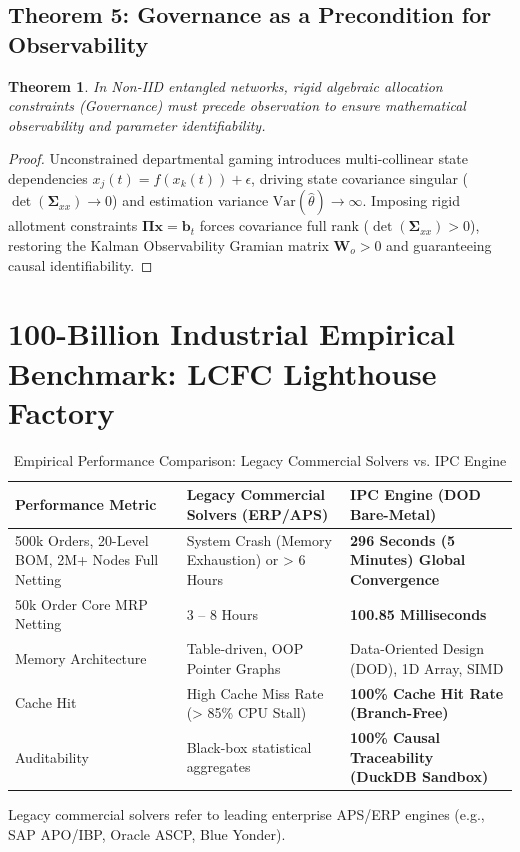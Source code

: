 \documentclass[11pt,a4paper]{article}
\newtheorem{theorem}{Theorem}[section]
\begin{document}
\subsection*{Theorem 5: Governance as a Precondition for Observability}
\begin{theorem}
In Non-IID entangled networks, rigid algebraic allocation constraints (Governance) must precede observation to ensure mathematical observability and parameter identifiability.
\end{theorem}
\begin{proof}
Unconstrained departmental gaming introduces multi-collinear state dependencies $x_j(t) = f(x_k(t)) + \epsilon$, driving state covariance singular ($\det(\mathbf{\Sigma}_{xx}) \to 0$) and estimation variance $\text{Var}(\hat{\theta}) \to \infty$. Imposing rigid allotment constraints $\mathbf{\Pi}\mathbf{x} = \mathbf{b}_t$ forces covariance full rank ($\det(\mathbf{\Sigma}_{xx}) > 0$), restoring the Kalman Observability Gramian matrix $\mathbf{W}_o > 0$ and guaranteeing causal identifiability.
\end{proof}

\newpage
\section*{100-Billion Industrial Empirical Benchmark: LCFC Lighthouse Factory}

\begin{table}[htbp]
\centering
\begin{threeparttable}
\caption{Empirical Performance Comparison: Legacy Commercial Solvers vs. IPC Engine}
\label{tab:lcfc_benchmark}
\begin{tabular}{p{5.5cm}p{4.5cm}p{4.5cm}}
\toprule
\textbf{Performance Metric} & \textbf{Legacy Commercial Solvers (ERP/APS)}\tnote{1} & \textbf{IPC Engine (DOD Bare-Metal)} \\
\midrule
500k Orders, 20-Level BOM, 2M+ Nodes Full Netting & System Crash (Memory Exhaustion) or > 6 Hours & \textbf{296 Seconds (5 Minutes) Global Convergence} \\
\midrule
50k Order Core MRP Netting & 3 -- 8 Hours & \textbf{100.85 Milliseconds} \\
\midrule
Memory Architecture & Table-driven, OOP Pointer Graphs & Data-Oriented Design (DOD), 1D Array, SIMD \\
\midrule
Cache Hit & High Cache Miss Rate (> 85\% CPU Stall) & \textbf{100\% Cache Hit Rate (Branch-Free)} \\
\midrule
Auditability & Black-box statistical aggregates & \textbf{100\% Causal Traceability (DuckDB Sandbox)} \\
\bottomrule
\end{tabular}
\begin{tablenotes}
\footnotesize
\item[1] Legacy commercial solvers refer to leading enterprise APS/ERP engines (e.g., SAP APO/IBP, Oracle ASCP, Blue Yonder).
\end{tablenotes}
\end{threeparttable}
\end{table}
\end{document}
